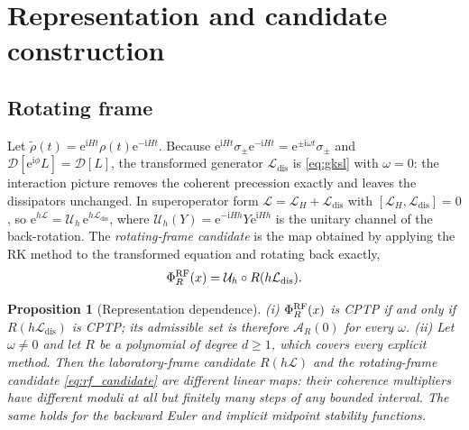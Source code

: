 \documentclass[pdflatex,sn-mathphys-num]{sn-jnl}
\newcommand{\e}{\mathrm{e}}
\newcommand{\ii}{\mathrm{i}}
\newcommand{\Adm}{\mathcal A}
\newcommand{\Lgen}{\mathcal L}
\newcommand{\Ldis}{\mathcal L_{\mathrm{dis}}}
\newcommand{\Uh}{\mathcal U}
\theoremstyle{thmstyleone}
\newtheorem{proposition}[theorem]{Proposition}
\theoremstyle{thmstylethree}
\theoremstyle{thmstyletwo}
\begin{document}
\section{Representation and candidate construction}\label{sec:candidates}

\subsection{Rotating frame}\label{sec:frame}

Let $\tilde\rho(t)=\e^{\ii Ht}\rho(t)\e^{-\ii Ht}$. Because $\e^{\ii Ht}\sigma_\pm\e^{-\ii Ht}=\e^{\pm\ii\omega t}\sigma_\pm$ and $\mathcal D[\e^{\ii\phi}L]=\mathcal D[L]$, the transformed generator $\Ldis$ is \eqref{eq:gksl} with $\omega=0$: the interaction picture removes the coherent precession exactly and leaves the dissipators unchanged. In superoperator form $\Lgen=\Lgen_H+\Ldis$ with $[\Lgen_H,\Ldis]=0$, so $\e^{h\Lgen}=\Uh_h\,\e^{h\Ldis}$, where $\Uh_h(Y)=\e^{-\ii Hh}Y\e^{\ii Hh}$ is the unitary channel of the back-rotation. The \emph{rotating-frame candidate} is the map obtained by applying the RK method to the transformed equation and rotating back exactly,
\begin{equation}
 \Phi^{\rm RF}_R(x)=\Uh_h\circ R(h\Ldis).
 \label{eq:rf_candidate}
\end{equation}

\begin{proposition}[Representation dependence]\label{prop:frame}
(i) $\Phi^{\rm RF}_R(x)$ is CPTP if and only if $R(h\Ldis)$ is CPTP; its admissible set is therefore $\Adm_R(0)$ for every $\omega$. (ii) Let $\omega\ne0$ and let $R$ be a polynomial of degree $d\ge1$, which covers every explicit method. Then the laboratory-frame candidate $R(h\Lgen)$ and the rotating-frame candidate \eqref{eq:rf_candidate} are different linear maps: their coherence multipliers have different moduli at all but finitely many steps of any bounded interval. The same holds for the backward Euler and implicit midpoint stability functions.
\end{proposition}
\end{document}
